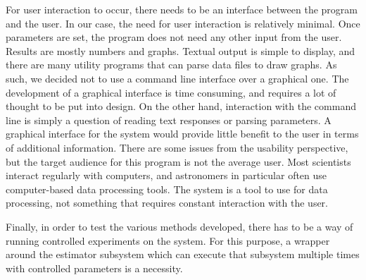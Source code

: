 \documentclass[a4paper,11pt]{article}
\begin{document}
   For user interaction to occur, there needs to be an interface between the
   program and the user. In our case, the need for user interaction is
   relatively minimal. Once parameters are set, the program does not need any
   other input from the user. Results are mostly numbers and graphs. Textual
   output is simple to display, and there are many utility programs that can
   parse data files to draw graphs. As such, we decided not to use a command
   line interface over a graphical one. The development of a graphical interface
   is time consuming, and requires a lot of thought to be put into design. On
   the other hand, interaction with the command line is simply a question of
   reading text responses or parsing parameters. A graphical interface for the
   system would provide little benefit to the user in terms of additional
   information. There are some issues from the usability perspective, but the
   target audience for this program is not the average user. Most scientists
   interact regularly with computers, and astronomers in particular often use
   computer-based data processing tools. The system is a tool to use for data
   processing, not something that requires constant interaction with the
   user.

   Finally, in order to test the various methods developed, there has to be a
   way of running controlled experiments on the system. For this purpose, a
   wrapper around the estimator subsystem which can execute that subsystem
   multiple times with controlled parameters is a necessity.
\end{document}
